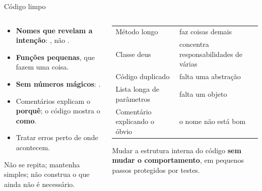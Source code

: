 \documentclass[aspectratio=169,10pt]{beamer}
\begin{document}
\begin{frame}{Código limpo}
  \begin{columns}[T]
    \begin{column}{0.5\textwidth}
      \begin{conceito}[Práticas]
        \begin{itemize}
          \item \textbf{Nomes que revelam a intenção}: , não .
          \item \textbf{Funções pequenas}, que fazem uma coisa.
          \item \textbf{Sem números mágicos}: .
          \item Comentários explicam o \textbf{porquê}; o código mostra o \textbf{como}.
          \item Tratar erros perto de onde acontecem.
        \end{itemize}
      \end{conceito}
      \begin{conceito}
        Não se repita; mantenha simples; não construa o que ainda não é necessário.
      \end{conceito}
    \end{column}
    \begin{column}{0.48\textwidth}
      \scriptsize
      \begin{tabularx}{\linewidth}{@{}l L@{}}
        \toprule
         &  \\
        \midrule
        Método longo & faz coisas demais \\
        Classe deus & concentra responsabilidades de várias \\
        Código duplicado & falta uma abstração \\
        Lista longa de parâmetros & falta um objeto \\
        Comentário explicando o óbvio & o nome não está bom \\
        \bottomrule
      \end{tabularx}
      \begin{definicao}[Refatoração]
        Mudar a estrutura interna do código \textbf{sem mudar o comportamento}, em pequenos passos protegidos por testes.
      \end{definicao}
    \end{column}
  \end{columns}
\end{frame}
\end{document}
